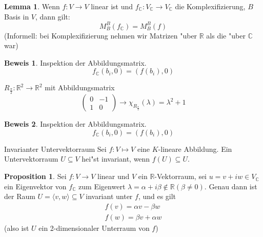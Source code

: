 \documentclass[oneside,fontsize=11pt,paper=a4,BCOR=0mm,DIV=12,automark,headsepline]{scrbook}
\theoremstyle{remark}
\theoremstyle{definition}
\newtheorem*{proposition}{Proposition}
\newtheorem{lemma}{Lemma}[section]
\theoremstyle{definition}
\newtheorem*{prof}{Beweis}
\theoremstyle{remark}
\begin{document}
\begin{lemma}
  Wenn $f: V\to V$ linear ist und \(f_{\mathbb{C}}: V_{\mathbb{C}} \to V_{\mathbb{C}}\) die Komplexifizierung, $B$ Basis
  in $V$, dann gilt: \[M^B_B(f_{\mathbb{C}}) = M^B_B(f)\] (Informell: bei Komplexifizierung nehmen wir Matrizen "uber \(\mathbb{R}\) als die "uber \(\mathbb{C}\) war)
\end{lemma}

\begin{prof}
  Inspektion der Abbildungsmatrix. \[f_{\mathbb{C}}(b_i,0) = (f(b_i), 0)\]
\end{prof}
\begin{exa}
  \(R_{\frac{\pi}{2}}: \mathbb{R}^2\to\mathbb{R}^2\) mit Abbildungsmatrix
  \[
    \begin{pmatrix}
      0 & -1 \\
      1 & 0
    \end{pmatrix}
    \rightarrow \chi_{R_{\frac{\pi}{2}}}(\lambda) = \lambda^2 + 1
\]
\end{exa}

\begin{prof}
  Inspektion der Abbildungsmatrix. \[f_{\mathbb{C}}(b_i,0) = (f(b_i), 0)\]
\end{prof}

\begin{definition}{Invarianter Untervektorraum}{}
  Sei $f: V \mapsto V$ eine $K$-lineare Abbildung. Ein Untervektorraum
  $U\subseteq V$ hei"st invariant, wenn $f(U) \subseteq U$.
\end{definition}

\begin{proposition}
  Sei \(f: V\to V\) linear und \(V\) ein \(\mathbb{R}\)-Vektorraum, sei \(u = v + i w \in V_{\mathbb{C}}\) ein Eigenvektor von \(f_{\mathbb{C}}\) zum Eigenwert \(\lambda = \alpha + i \beta \not\in \mathbb{R} (\beta \neq 0)\). Genau dann ist der Raum \(U = \langle v, w\rangle\subseteq V\) invariant unter \(f\), und es gilt
  \begin{align*}
    f(v) = \alpha v - \beta w\\
    f(w) = \beta v + \alpha w
  \end{align*}
  (also ist \(U\) ein 2-dimensionaler Unterraum von \(f\))
\end{proposition}
\end{document}

